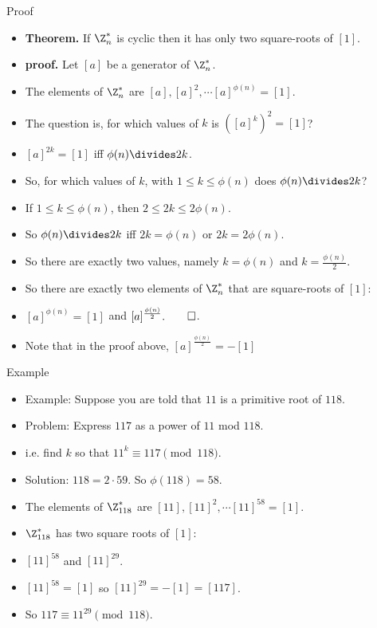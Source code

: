 \documentclass[handout]{beamer}
\begin{document}
\begin{frame}{Proof}

\begin{itemize}
  \item \textbf{Theorem.} If $\Z_n^*$ is cyclic then it has only two square-roots of $[1]$.
  \item \textbf{proof.} Let $[a]$ be a generator of $\Z_n^*$.
  \item The elements of $\Z_n^*$ are $[a],[a]^2,\cdots [a]^{\phi(n)} = [1]$.
  \item The question is, for which values of $k$  is $([a]^k)^2=[1]$?
  \item $[a]^{2k}=[1]$ iff $\phi(n)\divides 2k$.
  \item So, for which values of $k$, with $1\leq k \leq \phi(n)$ does $\phi(n)\divides 2k$?
  \item If $1\leq k \leq \phi(n)$, then $2\leq 2k \leq 2\phi(n)$.
  \item So $\phi(n)\divides 2k$ iff $2k = \phi(n)$ or $2k = 2\phi(n)$.
  \item So there are exactly two values, namely $k=\phi(n)$ and $k=\frac{\phi(n)}{2}$.
  \item So there are exactly two elements of $\Z_n^*$ that are square-roots of $[1]$:
  \item $[a]^{\phi(n)}=[1]$ and $[a]^{\frac{\phi(n)}{2}}.\qed$.
  \item Note that in the proof above, $[a]^{\frac{\phi(n)}{2}}=-[1]$
\end{itemize}

\end{frame}


\begin{frame}{Example}

\begin{itemize}
  \item Example: Suppose you are told that $11$ is a primitive root of $118$.
  \item Problem: Express $117$ as a power of $11$ mod $118$.
  \item i.e. find $k$ so that $11^k \equiv 117 \pmod {118}$.
  \item Solution: $118=2\cdot 59$. So $\phi(118) = 58$.
  \item The elements of $\Z_{118}^*$ are $[11],[11]^2,\cdots[11]^{58} = [1]$.
  \item $\Z_{118}^*$ has two square roots of $[1]$:
  \item $[11]^{58}$ and $[11]^{29}$.
  \item $[11]^{58} = [1]$ so $[11]^{29} = -[1] = [117]$.
  \item So $117 \equiv 11^{29} \pmod {118}$.
\end{itemize}

\end{frame}
\end{document}
